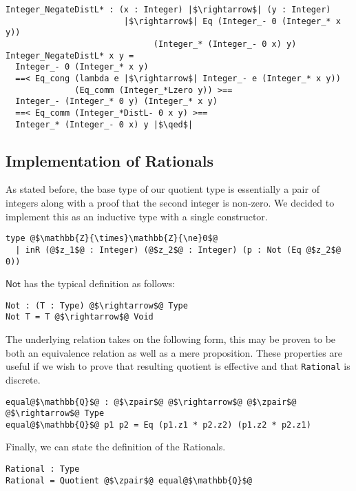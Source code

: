 \documentclass[12pt,twoside,maitrise]{dms}
\theoremstyle{definition}
\numberwithin{equation}{section}
\numberwithin{table}{chapter}
\numberwithin{figure}{chapter}
\newcommand\kw[1] {\textsf{#1}}
\newcommand\id[1] {\texttt{#1}}
\renewcommand\qed{\blacksquare}
\begin{document}
\begin{verbatim}
Integer_NegateDistL* : (x : Integer) |$\rightarrow$| (y : Integer)
                        |$\rightarrow$| Eq (Integer_- 0 (Integer_* x y))
                              (Integer_* (Integer_- 0 x) y)
Integer_NegateDistL* x y =
  Integer_- 0 (Integer_* x y)
  ==< Eq_cong (lambda e |$\rightarrow$| Integer_- e (Integer_* x y))
              (Eq_comm (Integer_*Lzero y)) >==
  Integer_- (Integer_* 0 y) (Integer_* x y)
  ==< Eq_comm (Integer_*DistL- 0 x y) >==
  Integer_* (Integer_- 0 x) y |$\qed$|
\end{verbatim}

\subsection*{Implementation of Rationals}
As stated before, the base type of our quotient type is essentially a pair of integers along with a proof that the second integer is non-zero. We decided to implement this as an inductive type with a single constructor.

\begin{verbatim}
type @$\mathbb{Z}{\times}\mathbb{Z}{\ne}0$@
  | inR (@$z_1$@ : Integer) (@$z_2$@ : Integer) (p : Not (Eq @$z_2$@ 0))
\end{verbatim}

$\kw{Not}$ has the typical definition as follows:
\begin{verbatim}
Not : (T : Type) @$\rightarrow$@ Type
Not T = T @$\rightarrow$@ Void
\end{verbatim}

The underlying relation takes on the following form, this may be proven to be
both an equivalence relation as well as a mere proposition. These properties are
useful if we wish to prove that resulting quotient is effective and that
\id{Rational} is discrete.

\begin{verbatim}
equal@$\mathbb{Q}$@ : @$\zpair$@ @$\rightarrow$@ @$\zpair$@ @$\rightarrow$@ Type
equal@$\mathbb{Q}$@ p1 p2 = Eq (p1.z1 * p2.z2) (p1.z2 * p2.z1)
\end{verbatim}

Finally, we can state the definition of the Rationals.

\begin{verbatim}
Rational : Type
Rational = Quotient @$\zpair$@ equal@$\mathbb{Q}$@
\end{verbatim}
\end{document}
